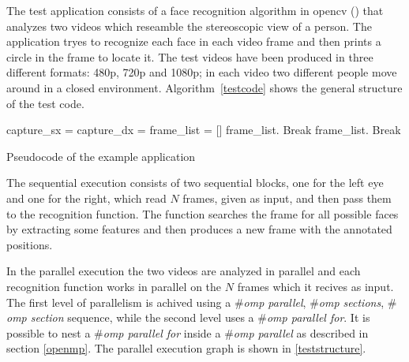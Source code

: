 \documentclass[a4paper,12pt,oneside]{book}
\begin{document}
The test application consists of a face recognition algorithm in opencv (\cite{opencv}\cite{openbook}) that analyzes two videos which reseamble the stereoscopic view of a person. The application tryes to recognize each face in each video frame and then prints a circle in the frame to locate it. The test videos have been produced in three different formats: 480p, 720p and 1080p; in each video two different people move around in a closed environment.  Algorithm~\ref{testcode} shows the general structure of the test code.

\begin{algorithm}
\begin{algorithmic}

\State capture\_sx = 
\State capture\_dx = 
\State frame\_list = []
\State frame\_list.
\State Break
\EndIf
\State {}
\EndFor
\EndWhile
{}
\State frame\_list.
\State Break
\EndIf
\State {}
\EndFor
\EndWhile
\EndFunction
\end{algorithmic}
\caption{Pseudocode of the example application }
\label{testcode}
\begin{algorithmic}
\State {}
\EndFor
\EndFunction
\end{algorithmic}

\end{algorithm}

The sequential execution consists of two sequential blocks, one for the left eye and one for the right, which read $N$ frames, given as input, and then pass them to the recognition function. The function searches the frame for all possible faces by extracting some features and then produces a new frame with the annotated positions.

In the parallel execution the two videos are analyzed in parallel and each recognition function works in parallel on the $N$ frames which it recives as input. The first level of parallelism is achived using a \emph{$\#$omp parallel}, \emph{$\#$omp sections}, \emph{$\#$omp section} sequence, while the second level uses a \emph{$\#$omp parallel for}. It is possible to nest a \emph{$\#$omp parallel for }inside a \emph{$\#$omp parallel} as described in section \ref{openmp}.
The parallel execution graph is shown in \ref{teststructure}. 
\end{document}
